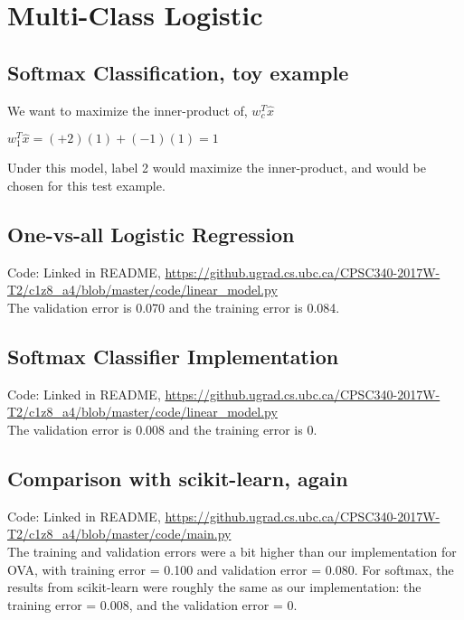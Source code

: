\documentclass{article}
\def\blu#1{{\color{blu}#1}}
\begin{document}
\section{Multi-Class Logistic}

\subsection{Softmax Classification, toy example}

We want to maximize the inner-product of, $w_c^T\hat{x}$

$w_1^T\hat{x} = (+2)(1) + (-1)(1) = 1$

\blu{Under this model, label 2 would maximize the inner-product, and would be chosen for this test example.}

\subsection{One-vs-all Logistic Regression}
Code: Linked in README, \url{https://github.ugrad.cs.ubc.ca/CPSC340-2017W-T2/c1z8_a4/blob/master/code/linear_model.py} \\
\blu{The validation error is 0.070 and the training error is 0.084.}

\subsection{Softmax Classifier Implementation}
Code: Linked in README, \url{https://github.ugrad.cs.ubc.ca/CPSC340-2017W-T2/c1z8_a4/blob/master/code/linear_model.py} \\
\blu{The validation error is 0.008 and the training error is 0.}

\subsection{Comparison with scikit-learn, again}
Code: Linked in README, \url{https://github.ugrad.cs.ubc.ca/CPSC340-2017W-T2/c1z8_a4/blob/master/code/main.py} \\
\blu{The training and validation errors were a bit higher than our implementation for OVA, with training error = 0.100 and validation error = 0.080. For softmax, the results from scikit-learn were roughly the same as our implementation: the training error = 0.008, and the validation error = 0.}
\end{document}
